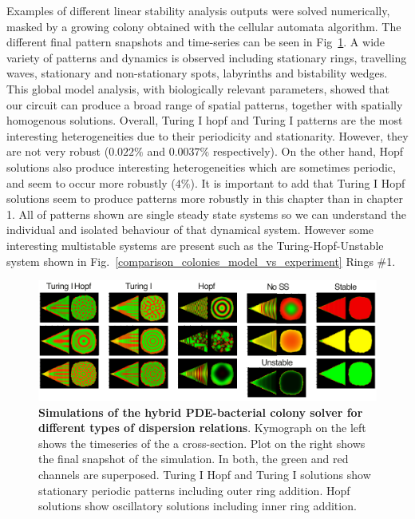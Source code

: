 Examples of different linear stability analysis outputs were solved numerically, masked by a growing colony obtained with the cellular automata algorithm.
The different final pattern snapshots and time-series can be seen in Fig~\ref{system_class_simulations}.
A wide variety of patterns and dynamics is observed including stationary rings, travelling waves, stationary and non-stationary spots, labyrinths and bistability wedges.
This global model analysis, with biologically relevant parameters, showed that our circuit can produce a broad range of spatial patterns, together with spatially homogenous solutions.
Overall, Turing I hopf and Turing I patterns are the most interesting heterogeneities due to their periodicity and stationarity.
However, they are not very robust ($0.022\%$ and $0.0037\%$ respectively).
On the other hand, Hopf solutions also produce interesting heterogeneities which are sometimes periodic, and seem to occur more robustly ($4\%$).
It is important to add that Turing I Hopf solutions seem to produce patterns more robustly in this chapter than in chapter 1. %
All of patterns shown are single steady state systems so we can understand the individual and isolated behaviour of that dynamical system.
However some interesting multistable systems are present such as the Turing-Hopf-Unstable system shown in Fig.~\ref{comparison_colonies_model_vs_experiment} Rings \#1.
\begin{figure}[H]
    \centering

    \includegraphics[width=1\textwidth]{chapters/Chapter 3/system_class_simulations}
    \caption{\textbf{Simulations of the hybrid PDE-bacterial colony solver for different types of dispersion relations}. Kymograph on the left shows the timeseries of the a cross-section. Plot on the right shows the final snapshot of the simulation. In both, the green and red channels are superposed. Turing I Hopf and Turing I solutions show stationary periodic patterns including outer ring addition. Hopf solutions show oscillatory solutions including inner ring addition.}
    \label{system_class_simulations}
\end{figure}



